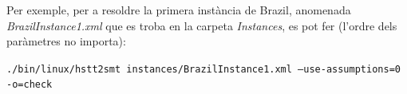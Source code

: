 \documentclass[11pt,a4paper,twoside]{report}
\begin{document}
  Per exemple, per a resoldre la primera instància de Brazil, anomenada \textit{BrazilInstance1.xml} que es troba en la carpeta \textit{Instances}, es pot fer (l'ordre dels paràmetres no importa):

  \begin{center}
    \texttt{./bin/linux/hstt2smt instances/BrazilInstance1.xml --use-assumptions=0 -o=check}
  \end{center}
  
  
\end{document}
